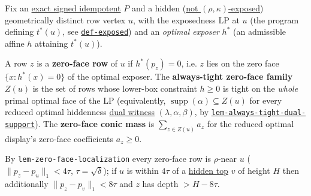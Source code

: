 \hypertarget{def:zero-face}{}%
\begin{definition}\label{def:zero-face}
Fix an \hyperref[def:signed-idempotent]{exact signed idempotent} $P$ and a hidden
(\hyperref[def:exposed]{not $(\rho,\kappa)$-exposed}) geometrically distinct row vertex $u$, with the
exposedness LP at $u$ (the program defining $t^*(u)$, see \hyperref[def:exposed]{\texttt{def-\allowbreak{}exposed}}) and an \emph{optimal exposer}
$h^*$ (an admissible affine $h$ attaining $t^*(u)$).

A row $z$ is a \textbf{zero-face row} of $u$ if $h^*(p_z)=0$, i.e. $z$ lies on the zero face
$\{x:h^*(x)=0\}$ of the optimal exposer. The \textbf{always-tight zero-face family} $Z(u)$ is the set of
rows whose lower-box constraint $h\ge 0$ is tight on the \emph{whole} primal optimal face of the LP
(equivalently, $\operatorname{supp}(\alpha)\subseteq Z(u)$ for every reduced optimal hiddenness
\hyperref[def:dual-witness]{dual witness} $(\lambda,\alpha,\beta)$, by \hyperlink{dag:lem-always-tight-dual-support}{\texttt{lem-\allowbreak{}always-\allowbreak{}tight-\allowbreak{}dual-\allowbreak{}support}}).
The \textbf{zero-face conic mass} is $\sum_{z\in Z(u)}a_z$ for the reduced optimal display's zero-face
coefficients $a_z\ge 0$.

By \texttt{lem-\allowbreak{}zero-\allowbreak{}face-\allowbreak{}localization} every zero-face row is $\rho$-near $u$
($\lVert p_z-p_u\rVert_1<4\tau$, $\tau=\sqrt{\delta}$); if $u$ is within $4\tau$ of a
\hyperref[def:height]{hidden top} $v$ of height $H$ then additionally $\lVert p_z-p_v\rVert_1<8\tau$ and $z$
has depth $>H-8\tau$.
\end{definition}
